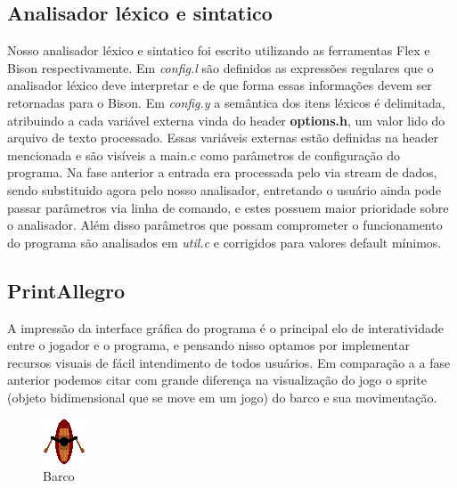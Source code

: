 \documentclass[a4paper,11pt]{article}
\begin{document}
\subsection{Analisador léxico e sintatico}
Nosso analisador léxico e sintatico foi escrito utilizando as ferramentas Flex e Bison respectivamente. Em \textit{config.l} são definidos as expressões regulares que o analisador léxico deve interpretar e de que forma essas informa\c{c}ões devem ser retornadas para o Bison. Em \textit{config.y} a semântica dos itens léxicos é delimitada, atribuindo a cada variável externa vinda do header \textbf{options.h}, um valor lido do arquivo de texto processado. Essas variáveis externas estão definidas na header mencionada e são visíveis a main.c como parâmetros de configura\c{c}ão do programa. Na fase anterior a entrada era processada pelo via stream de dados, sendo substituido agora pelo nosso analisador, entretando o usuário ainda pode passar parâmetros via linha de comando, e estes possuem maior prioridade sobre o analisador. Além disso parâmetros que possam comprometer o funcionamento do programa são analisados em \textit{util.c} e corrigidos para valores default mínimos.

\subsection{PrintAllegro}
A impressão da interface gráfica do programa é o principal elo de interatividade entre o jogador e o programa, e pensando nisso optamos por implementar recursos visuais de fácil intendimento de todos usuários. Em compara\c{c}ão a a fase anterior podemos citar com grande diferen\c{c}a na visualiza\c{c}ão do jogo o sprite (objeto bidimensional que se move em um jogo) do barco e sua movimenta\c{c}ão.

\begin{figure}[htb]
\begin{center}
\includegraphics[scale=0.70]{boat.png}
\caption{Barco}
\end{center}
\end{figure}
\end{document}
